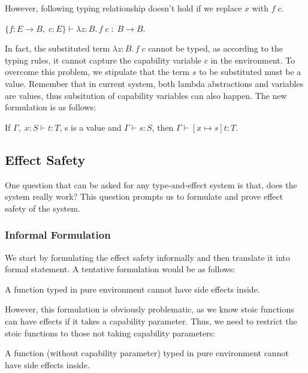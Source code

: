 However, following typing relationship doesn't hold if we replace
$x$ with $f \; c$.

\begin{center}
$\{f: E \to B,\; c:E\} \vdash \lambda z:B.\,f \; c \; : \; B \to B$.
\end{center}

In fact, the substituted term $\lambda z:B.\,f \; c$ cannot be typed,
as according to the typing rules, it cannot capture the capability
variable $c$ in the environment. To overcome this problem, we
stipulate that the term $s$ to be substituted must be a
value. Remember that in current system, both lambda abstractions and
variables are values, thus subsitution of capability variables can
also happen. The new formulation is as follows:

\begin{lemma}
  If $\Gamma,\; x:S \vdash t : T$, s is a value and
  $\Gamma \vdash s : S$, then $\Gamma \vdash [x \mapsto s]t : T$.
\end{lemma}

\subsection{Effect Safety}

One question that can be asked for any type-and-effect system is that,
does the system really work? This question prompts us to formulate and
prove effect safety of the system.

\subsubsection{Informal Formulation}

We start by formulating the effect safety informally and then
translate it into formal statement. A tentative formulation would be
as follows:

\begin{definition}
A function typed in pure environment cannot have side effects inside.
\end{definition}

However, this formulation is obviously problematic, as we know stoic
functions can have effects if it takes a capability parameter. Thus,
we need to restrict the stoic functions to those not taking capability
parameters:

\begin{definition}
  A function (without capability parameter) typed in pure environment
  cannot have side effects inside.
\end{definition}

